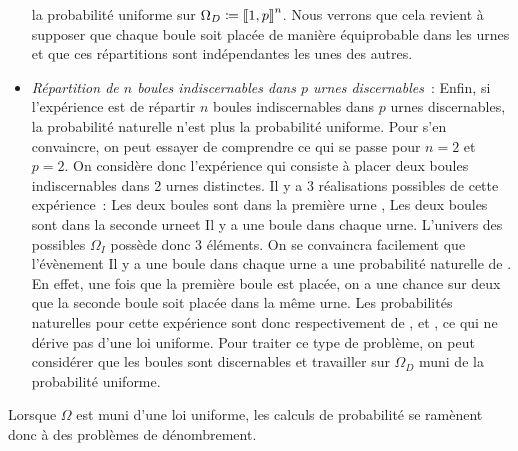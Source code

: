 \documentclass{magnolia}
\begin{document}
\begin{remarques}
\begin{itemize}
    la probabilité uniforme sur $\Omega_D\coloneqq\left\llbracket 1,p\right\rrbracket^n$. Nous verrons que cela revient à supposer que chaque
    boule soit placée de manière équiprobable dans les urnes et que ces répartitions sont indépendantes les unes
    des autres.
  \item \emph{Répartition de $n$ boules indiscernables dans $p$ urnes discernables}~: Enfin, si l'expérience
    est de répartir $n$ boules indiscernables dans $p$ urnes discernables, la probabilité naturelle n'est
    plus la probabilité uniforme. Pour s'en convaincre, on peut essayer de comprendre ce qui se passe pour
    $n=2$ et $p=2$. On considère donc l'expérience qui consiste à placer deux boules indiscernables dans 2 urnes
    distinctes. Il y a 3 réalisations possibles de cette expérience~: \og Les deux boules sont dans la première urne \fg,
    \og Les deux boules sont dans la seconde urne\fg et \og Il y a une boule dans chaque urne\fg. L'univers des possibles
    $\Omega_I$ possède donc 3 éléments. On se convaincra facilement que l'évènement \og Il y a une boule dans
    chaque urne \fg a une probabilité naturelle de . En effet, une fois que la première boule est placée,
    on a une chance sur deux que la seconde boule soit placée dans la même urne. Les probabilités naturelles
    pour cette expérience sont donc respectivement de ,  et , ce
    qui ne dérive pas d'une loi uniforme. Pour traiter ce type de problème, on peut considérer que
    les boules sont discernables et travailler sur $\Omega_D$ muni de la probabilité uniforme.
  \end{itemize}
\remarque Lorsque $\Omega$ est muni d'une loi uniforme, les calculs de probabilité se ramènent donc à des
  problèmes de dénombrement.
\end{remarques}
\end{document}
